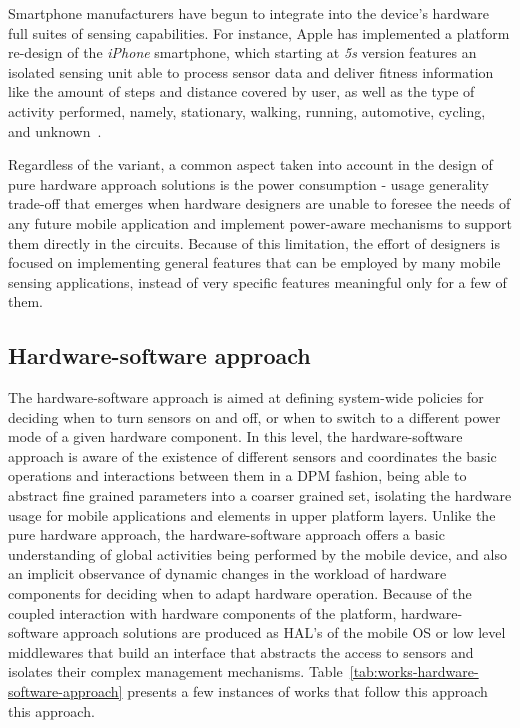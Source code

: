 \documentclass[ENG,PhD]{cinvestav}
\begin{document}
Smartphone manufacturers have begun to integrate into the device's hardware full suites of sensing capabilities.
For instance, Apple has implemented a platform re-design of the \emph{iPhone} smartphone, which starting at \emph{5s} version features an isolated sensing unit able to process sensor data and deliver fitness information like the amount of steps and distance covered by user, as well as the type of activity performed, namely, stationary, walking, running, automotive, cycling, and unknown~\cite{Apple2015}.

Regardless of the variant, a common aspect taken into account in the design of pure hardware approach solutions is the power consumption - usage generality trade-off that emerges when hardware designers are unable to foresee the needs of any future mobile application and implement power-aware mechanisms to support them directly in the circuits.
Because of this limitation, the effort of designers is focused on implementing general features that can be employed by many mobile sensing applications, instead of very specific features meaningful only for a few of them.

\subsection{Hardware-software approach}

The hardware-software approach is aimed at defining system-wide policies for deciding when to turn sensors on and off, or when to switch to a different power mode of a given hardware component.
In this level, the hardware-software approach is aware of the existence of different sensors and coordinates the basic operations and interactions between them in a DPM fashion, being able to abstract fine grained parameters into a coarser grained set, isolating the hardware usage for mobile applications and elements in upper platform layers.
Unlike the pure hardware approach, the hardware-software approach offers a basic understanding of global activities being performed by the mobile device, and also an implicit observance of dynamic changes in the workload of hardware components for deciding when to adapt hardware operation.
Because of the coupled interaction with hardware components of the platform, hardware-software approach solutions are produced as HAL's of the mobile OS or low level middlewares that build an interface that abstracts the access to sensors and isolates their complex management mechanisms.
Table~\ref{tab:works-hardware-software-approach} presents a few instances of works that follow this approach this approach.
\end{document}
